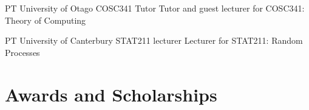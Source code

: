 \documentclass[10pt]{article} %
\begin{document}
\begin{paracol}{2}
{PT} %
{University of Otago} %
{COSC341 Tutor} %
{Tutor and guest lecturer for COSC341: Theory of Computing	
} %

{PT} %
{University of Canterbury} %
{STAT211 lecturer} %
{Lecturer for STAT211: Random Processes	
} %









%
%
%
%
%
%

\section{Awards and Scholarships}


\end{paracol}
\end{document}
